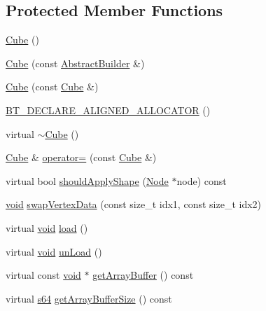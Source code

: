\subsection*{Protected Member Functions}
\begin{DoxyCompactItemize}
\item 
\mbox{\hyperlink{classnjli_1_1_cube_a5535d8b421b251568aa2683e68565ae2}{Cube}} ()
\item 
\mbox{\hyperlink{classnjli_1_1_cube_a13c6574a55b74a5a67924faa3936f038}{Cube}} (const \mbox{\hyperlink{classnjli_1_1_abstract_builder}{Abstract\+Builder}} \&)
\item 
\mbox{\hyperlink{classnjli_1_1_cube_a5a3ed8352356dd46e9ed33768bf668c5}{Cube}} (const \mbox{\hyperlink{classnjli_1_1_cube}{Cube}} \&)
\item 
\mbox{\hyperlink{classnjli_1_1_cube_a11c489f16e5521c12bfbdc6cfd18487e}{B\+T\+\_\+\+D\+E\+C\+L\+A\+R\+E\+\_\+\+A\+L\+I\+G\+N\+E\+D\+\_\+\+A\+L\+L\+O\+C\+A\+T\+OR}} ()
\item 
virtual \mbox{\hyperlink{classnjli_1_1_cube_a41fff9f47251ee2a39b54866b906200e}{$\sim$\+Cube}} ()
\item 
\mbox{\hyperlink{classnjli_1_1_cube}{Cube}} \& \mbox{\hyperlink{classnjli_1_1_cube_a58e0e6d84676354a1cb2198194495a8a}{operator=}} (const \mbox{\hyperlink{classnjli_1_1_cube}{Cube}} \&)
\item 
virtual bool \mbox{\hyperlink{classnjli_1_1_cube_ae9b5fd0928a0e47ad37114ca9da6f41a}{should\+Apply\+Shape}} (\mbox{\hyperlink{classnjli_1_1_node}{Node}} $\ast$node) const
\item 
\mbox{\hyperlink{_thread_8h_af1e856da2e658414cb2456cb6f7ebc66}{void}} \mbox{\hyperlink{classnjli_1_1_cube_af902a20050d40c642b6c5e7def28cce0}{swap\+Vertex\+Data}} (const size\+\_\+t idx1, const size\+\_\+t idx2)
\item 
virtual \mbox{\hyperlink{_thread_8h_af1e856da2e658414cb2456cb6f7ebc66}{void}} \mbox{\hyperlink{classnjli_1_1_cube_ac4040d5afd8034ba6cafca66d472c966}{load}} ()
\item 
virtual \mbox{\hyperlink{_thread_8h_af1e856da2e658414cb2456cb6f7ebc66}{void}} \mbox{\hyperlink{classnjli_1_1_cube_a6699821443ee652912052b4d8ddf58e1}{un\+Load}} ()
\item 
virtual const \mbox{\hyperlink{_thread_8h_af1e856da2e658414cb2456cb6f7ebc66}{void}} $\ast$ \mbox{\hyperlink{classnjli_1_1_cube_a33f8ca33a86505fa1bbee02e7ae9ac77}{get\+Array\+Buffer}} () const
\item 
virtual \mbox{\hyperlink{_util_8h_a4258bfb2c3a440d06c4aaa3c2b450dde}{s64}} \mbox{\hyperlink{classnjli_1_1_cube_a44544af58aae672e358e364877af9a16}{get\+Array\+Buffer\+Size}} () const

\end{DoxyCompactItemize}
